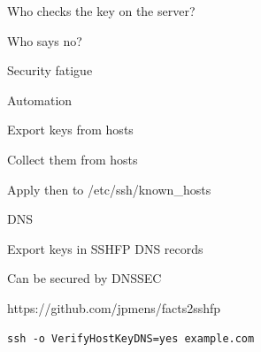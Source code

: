 \begin{iframe}
\item Who checks the key on the server?
\item Who says no?
\item Security fatigue
\end{iframe}

\begin{iframe}
\item Automation
\item Export keys from hosts
\item Collect them from hosts
\item Apply then to /etc/ssh/known\_hosts
\end{iframe}

\begin{frame}[fragile]
\lstset{basicstyle=\large\fsfont}

\end{frame}

\begin{frame}[fragile]
\lstset{basicstyle=\large\fsfont}

\end{frame}

\begin{iframe}
\item DNS
\item Export keys in SSHFP DNS records
\item Can be secured by DNSSEC
\item https://github.com/jpmens/facts2sshfp
\end{iframe}

\begin{frame}[fragile]
\lstset{basicstyle=\large\fsfont}

\end{frame}


\begin{frame}[fragile]
\lstset{basicstyle=\large\fsfont}
\begin{lstlisting}
ssh -o VerifyHostKeyDNS=yes example.com
\end{lstlisting}
\end{frame}

\begin{frame}[fragile]
\lstset{basicstyle=\large\fsfont}

\end{frame}


